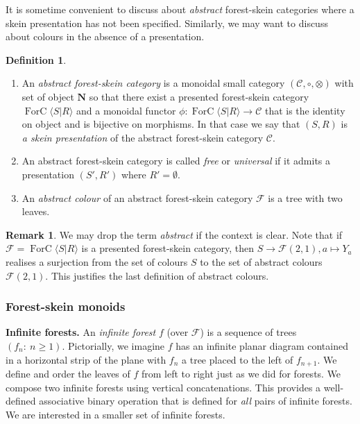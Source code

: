 \documentclass[a4paper, 12pt]{amsart}
\numberwithin{equation}{section}
\theoremstyle{definition}
\newtheorem{definition}[theorem]{Definition}
\newtheorem{remark}[theorem]{Remark}
\newcommand{\cC}{\mathcal C}
\newcommand{\cF}{\mathcal F}
\DeclareMathOperator{\FC}{ForC}
\newcommand{\la}{\langle}
\newcommand{\N}{\mathbf{N}}
\newcommand{\ot}{\otimes}
\newcommand{\ra}{\rangle}
\begin{document}
It is sometime convenient to discuss about {\it abstract} forest-skein categories where a skein presentation has not been specified. Similarly, we may want to discuss about colours in the absence of a presentation.

\begin{definition}
\begin{enumerate}
\item An {\it abstract forest-skein category} is a monoidal small category $(\cC,\circ,\ot)$ with set of object $\N$ so that there exist a presented forest-skein category $\FC\langle S| R\rangle$ and a monoidal functor $\phi:\FC\langle S| R\rangle\to \cC$ that is the identity on object and is bijective on morphisms.
In that case we say that $(S,R)$ is \textit{a skein presentation} of the abstract forest-skein category $\cC$. 
\item An abstract forest-skein category is called \textit{free} or \textit{universal} if it admits a presentation $(S',R')$ where $R'=\emptyset$. 
\item An {\it abstract colour} of an abstract forest-skein category $\cF$ is a tree with two leaves.
\end{enumerate}
\end{definition}

\begin{remark}\label{rem:colour}
We may drop the term {\it abstract} if the context is clear.
Note that if $\cF=\FC\la S|R\ra$ is a presented forest-skein category, then $S\to\cF(2,1), a\mapsto Y_a$ realises a surjection from the set of colours $S$ to the set of abstract colours $\cF(2,1)$.
This justifies the last definition of abstract colours.
\end{remark}

\subsubsection{Forest-skein monoids}

{\bf Infinite forests.}
An \textit{infinite forest} $f$ (over $\cF$) is a sequence of trees $(f_n:\ n\geq 1)$.
Pictorially, we imagine $f$ has an infinite planar diagram contained in a horizontal strip of the plane with $f_{n}$ a tree placed to the left of $f_{n+1}$.
We define and order the leaves of $f$ from left to right just as we did for forests. 
We compose two infinite forests using vertical concatenations.
This provides a well-defined associative binary operation that is defined for {\it all} pairs of infinite forests.
We are interested in a smaller set of infinite forests.
\end{document}
